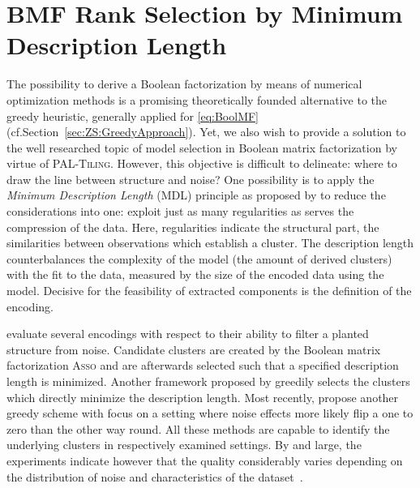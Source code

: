 \chapter{BMF Rank Selection by Minimum Description Length}
\label{chap:RankMDL}
The possibility to derive a Boolean factorization by means of  numerical optimization methods is a promising theoretically founded alternative to the greedy heuristic, generally applied for \ref{eq:BoolMF} (cf.\@ Section~\ref{sec:ZS:GreedyApproach}). Yet, we also wish to provide a solution to the well researched topic of model selection in Boolean matrix factorization by virtue of \textsc{PAL-Tiling}.  
However, this objective is difficult to delineate: where to draw the line between structure and noise? One possibility is to apply the \emph{Minimum Description Length} (MDL) principle as proposed by \cite{miettinen2014mdl4bmf} to reduce the considerations into one: exploit just as many regularities as serves the compression of the data. Here, regularities indicate the structural part, 
the similarities between observations which establish a cluster. The description length counterbalances the complexity of the model (the amount of derived clusters) with the fit to the data, measured by the size of the encoded data using the model. Decisive for the feasibility of extracted components is the definition of the encoding. 

\cite{miettinen2014mdl4bmf} evaluate several encodings with respect to their ability to filter a planted structure from noise. Candidate clusters are created by the Boolean matrix factorization \textsc{Asso} and are afterwards selected such that a specified description length is minimized. Another framework proposed by \cite{lucchese2014unifying} greedily selects the clusters which directly minimize the description length. Most recently, \cite{karaev2015getting} propose another greedy scheme with focus on a setting where noise effects more likely flip a one to zero than the other way round. All these methods are capable to identify the underlying clusters in respectively examined settings. By and large, the experiments indicate however that the quality considerably varies depending on the distribution of noise and characteristics of the dataset~\citep{miettinen2014mdl4bmf,karaev2015getting}.  

